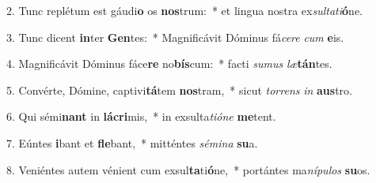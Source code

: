 2. Tunc replétum est gáudi\textbf{o} os \textbf{nos}trum:~*  et lingua nostra ex\textit{sul}\textit{ta}\textit{ti}\textbf{ó}ne.\

3. Tunc dicent \textbf{in}ter \textbf{Gen}tes:~*  Magnificávit Dóminus fá\textit{ce}\textit{re} \textit{cum} \textbf{e}is.\

4. Magnificávit Dóminus fáce\textbf{re} no\textbf{bís}cum:~*  facti \textit{su}\textit{mus} \textit{læ}\textbf{tán}tes.\

5. Convérte, Dómine, captivi\textbf{tá}tem \textbf{nos}tram,~*  sicut \textit{tor}\textit{rens} \textit{in} \textbf{aus}tro.\

6. Qui sémi\textbf{nant} in \textbf{lá}\textbf{cri}mis,~*  in exsulta\textit{ti}\textit{ó}\textit{ne} \textbf{me}tent.\

7. Eúntes \textbf{i}bant et \textbf{fle}bant,~*  mitténtes \textit{sé}\textit{mi}\textit{na} \textbf{su}a.\

8. Veniéntes autem vénient cum exsul\textbf{ta}ti\textbf{ó}ne,~*  portántes ma\textit{ní}\textit{pu}\textit{los} \textbf{su}os.\

